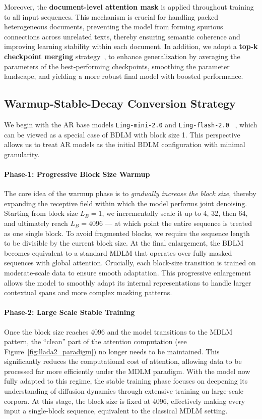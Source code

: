 Moreover, the \textbf{document-level attention mask} is applied throughout training to all input sequences. This mechanism is crucial for handling packed heterogeneous documents, preventing the model from forming spurious connections across unrelated texts, thereby ensuring semantic coherence and improving learning stability within each document. In addition, we adopt a \textbf{top-k checkpoint merging} strategy~\citep{tian2025wsm}, to enhance generalization by averaging the parameters of the best-performing checkpoints, smoothing the parameter landscape, and yielding a more robust final model with boosted performance. 


\subsection{Warmup-Stable-Decay Conversion Strategy}\label{sec:warmup} We begin with the AR base models \texttt{Ling-mini-2.0} and \texttt{Ling-flash-2.0} ~\citep{lingv2}, which can be viewed as a special case of BDLM with block size 1. This perspective allows us to treat AR models as the initial BDLM configuration with minimal granularity.

\paragraph{Phase-1: Progressive Block Size Warmup} The core idea of the warmup phase is to \emph{gradually increase the block size}, thereby expanding the receptive field within which the model performs joint denoising. Starting from block size $L_B = 1$, we incrementally scale it up to 4, 32, then 64, and ultimately reach $L_B = 4096$ — at which point the entire sequence is treated as one single block. To avoid fragmented blocks, we require the sequence length to be divisible by the current block size. At the final enlargement, the BDLM becomes equivalent to a standard MDLM that operates over fully masked sequences with global attention. Crucially, each block-size transition is trained on moderate-scale data to ensure smooth adaptation. This progressive enlargement allows the model to smoothly adapt its internal representations to handle larger contextual spans and more complex masking patterns.

\paragraph{Phase-2: Large Scale Stable Training} Once the block size reaches 4096 and the model transitions to the MDLM pattern, the ``clean'' part of the attention computation (see Figure~\ref{fig:llada2_paradigm}) no longer needs to be maintained. This significantly reduces the computational cost of attention, allowing data to be processed far more efficiently under the MDLM paradigm. With the model now fully adapted to this regime, the stable training phase focuses on deepening its understanding of diffusion dynamics through extensive training on large-scale corpora. At this stage, the block size is fixed at 4096, effectively making every input a single-block sequence, equivalent to the classical MDLM setting.

